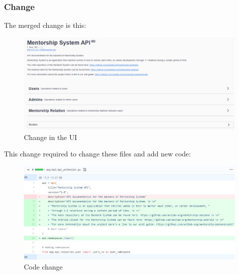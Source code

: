 \documentclass{article}
\begin{document}
\subsubsection{Change}
\hspace{0.5cm}The merged change is this:
\begin{figure}[tph!]
\centerline{\includegraphics[totalheight=8cm, width=18cm]{issue482-UI.png}}
    \caption{Change in the UI}
    \label{fig:verticalcell}
\end{figure}
\vfill
\clearpage
\hspace{0.5cm}This change required to change these files and add new code:
\begin{figure}[tph!]
\centerline{\includegraphics[totalheight=8cm, width=18cm]{change-issue482.png}}
    \caption{Code change}
    \label{fig:verticalcell}
\end{figure}

\vfill
\clearpage
\end{document}
